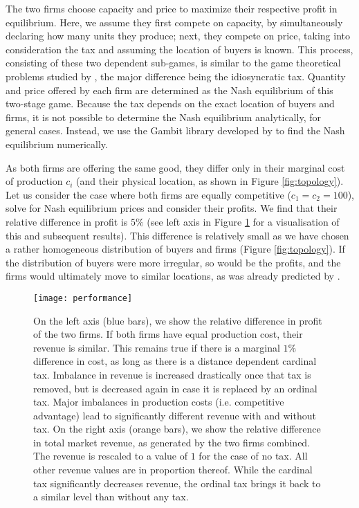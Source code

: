\documentclass[final,5p,times,twocolumn,11pt,authoryear]{elsarticle}
\numberwithin{equation}{section} %
\begin{document}
The two firms choose capacity and price to maximize their respective profit in equilibrium. 
Here, we assume they first compete on capacity, by simultaneously declaring how many units they produce;
next, they compete on price, taking into consideration the tax and assuming the location of buyers is known. 
This process, consisting of these two dependent sub-games, is similar to the game theoretical problems studied by \cite{Kreps1983}, the major difference being the idiosyncratic tax.
Quantity and price offered by each firm are determined as the Nash equilibrium of this two-stage game. 
Because the tax depends on the exact location of buyers and firms, 
it is not possible to determine the Nash equilibrium analytically, for general cases. 
Instead, we use the Gambit library developed by \cite{McKelvey2016} to find the Nash equilibrium numerically. 

As both firms are offering the same good, they differ only in their marginal cost of production $c_i$ (and their physical location, as shown in Figure \ref{fig:topology}). 
Let us consider the case where both firms are equally competitive ($c_1 = c_2 = 100$), solve for Nash equilibrium prices and consider their profits. 
We find that their relative difference in profit is $5\%$ (see left axis in Figure \ref{fig:results} for a visualisation of this and subsequent results).
This difference is relatively small as we have chosen a rather homogeneous distribution of buyers and firms (Figure \ref{fig:topology}).
If the distribution of buyers were more irregular, so would be the profits, and the firms would ultimately move to similar locations, as was already predicted by \cite{Hotelling1929}.

\begin{figure}[!htb]
	\centering
	\texttt{[image: performance]}
	\caption{	On the left axis (blue bars), we show the relative difference in profit of the two firms.
			If both firms have equal production cost, their revenue is similar. 
			This remains true if there is a marginal $1\%$ difference in cost, as long as there is a distance dependent cardinal tax. 
			Imbalance in revenue is increased drastically once that tax is removed, but is decreased again in case it is replaced by an ordinal tax. 
			Major imbalances in production costs (i.e. competitive advantage) lead to significantly different revenue with and without tax. 
			On the right axis (orange bars), we show the relative difference in total market revenue, as generated by the two firms combined. 
			The revenue is rescaled to a value of $1$ for the case of no tax. 
			All other revenue values are in proportion thereof. 
			While the cardinal tax significantly decreases revenue, the ordinal tax brings it back to a similar level than without any tax. 
			}
	\label{fig:results}
\end{figure}
\end{document}
